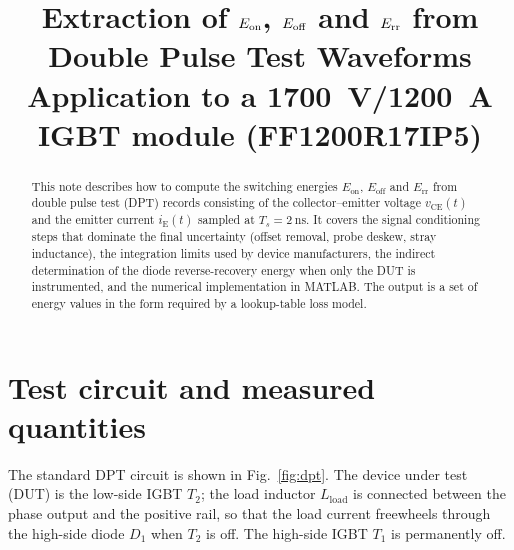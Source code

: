 \documentclass[11pt,a4paper]{article}
\title{Extraction of $\Eon$, $\Eoff$ and $\Err$ from Double Pulse Test Waveforms\\
\large Application to a \SI{1700}{\volt}/\SI{1200}{\ampere} IGBT module (FF1200R17IP5)}
\author{}
\date{}
\newcommand{\Eon}{E_{\mathrm{on}}}
\newcommand{\Eoff}{E_{\mathrm{off}}}
\newcommand{\Err}{E_{\mathrm{rr}}}
\newcommand{\vce}{v_{\mathrm{CE}}}
\begin{document}
\maketitle

\begin{abstract}
This note describes how to compute the switching energies $\Eon$, $\Eoff$ and $\Err$
from double pulse test (DPT) records consisting of the collector--emitter voltage
$\vce(t)$ and the emitter current $i_{\mathrm{E}}(t)$ sampled at
$T_s=\SI{2}{\nano\second}$. It covers the signal conditioning steps that dominate the
final uncertainty (offset removal, probe deskew, stray inductance), the integration
limits used by device manufacturers, the indirect determination of the diode
reverse-recovery energy when only the DUT is instrumented, and the numerical
implementation in MATLAB. The output is a set of energy values in the form required by
a lookup-table loss model.
\end{abstract}

\section{Test circuit and measured quantities}

The standard DPT circuit is shown in Fig.~\ref{fig:dpt}. The device under test (DUT) is
the low-side IGBT $T_2$; the load inductor $L_{\mathrm{load}}$ is connected between the
phase output and the positive rail, so that the load current freewheels through the
high-side diode $D_1$ when $T_2$ is off. The high-side IGBT $T_1$ is permanently off.
\end{document}
